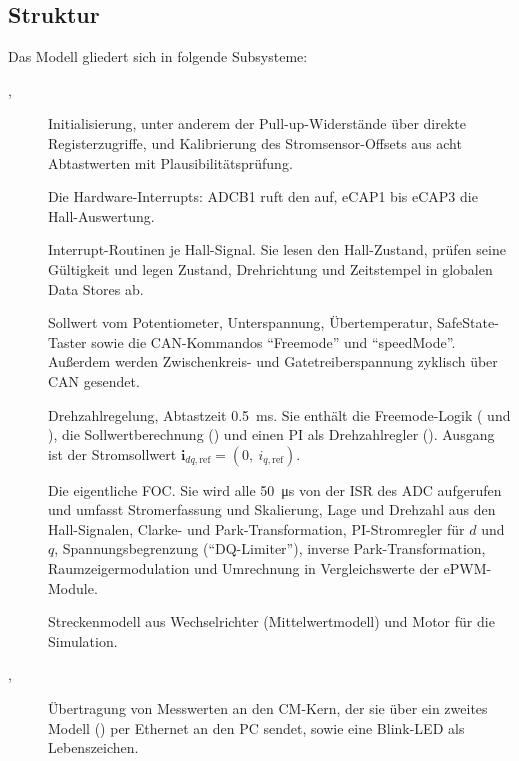 \subsection{Struktur}

Das Modell gliedert sich in folgende Subsysteme:

\begingroup\sloppy
\begin{description}
  \item[, ] Initialisierung, unter
    anderem der Pull-up-Widerstände über direkte Registerzugriffe, und Kalibrierung des
    Stromsensor-Offsets aus acht Abtastwerten mit Plausibilitätsprüfung.
  \item[] Die Hardware-Interrupts: ADCB1 ruft den
     auf, eCAP1 bis eCAP3 die Hall-Auswertung.
  \item[] Interrupt-Routinen je Hall-Signal. Sie lesen den
    Hall-Zustand, prüfen seine Gültigkeit und legen Zustand, Drehrichtung und Zeitstempel
    in globalen Data Stores ab.
  \item[] Sollwert vom Potentiometer, Unterspannung,
    Übertemperatur, SafeState-Taster sowie die CAN-Kommandos \enquote{Freemode} und
    \enquote{speedMode}. Außerdem werden Zwischenkreis- und Gatetreiberspannung zyklisch
    über CAN gesendet.
  \item[] Drehzahlregelung, Abtastzeit \SI{0,5}{\milli\second}. Sie
    enthält die Freemode-Logik ( und
    ), die Sollwertberechnung ()
    und einen \ac{PI} als Drehzahlregler (). Ausgang ist der
    Stromsollwert $\boldsymbol{i}_{dq,\mathrm{ref}} = (0,\ i_{q,\mathrm{ref}})$.
  \item[] Die eigentliche \ac{FOC}. Sie wird alle
    \SI{50}{\micro\second} von der \ac{ISR} des \ac{ADC} aufgerufen und umfasst
    Stromerfassung und Skalierung, Lage und Drehzahl aus den Hall-Signalen, Clarke- und
    Park-Transformation, \acs{PI}-Stromregler für $d$ und $q$,
    Spannungsbegrenzung (\enquote{DQ-Limiter}), inverse Park-Transformation,
    Raumzeigermodulation und Umrechnung in Vergleichswerte der ePWM-Module.
  \item[] Streckenmodell aus Wechselrichter
    (Mittelwertmodell) und Motor für die Simulation.
  \item[, ] Übertragung von Messwerten
    an den \ac{CM}-Kern, der sie über ein zweites Modell () per
    Ethernet an den PC sendet, sowie eine Blink-LED als Lebenszeichen.
\end{description}
\endgroup

